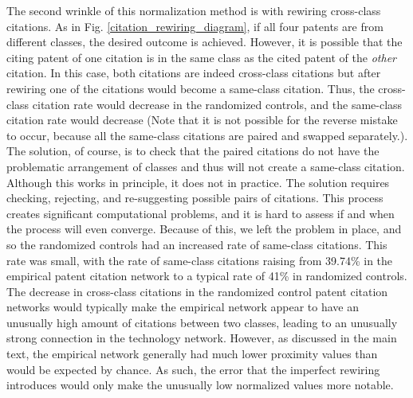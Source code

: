\documentclass[]{svjour3}
\begin{document}
The second wrinkle of this normalization method is with rewiring cross-class citations. As in Fig. \ref{citation_rewiring_diagram}, if all four patents are from different classes, the desired outcome is achieved. However, it is possible that the citing patent of one citation is in the same class as the cited patent of the \textit{other} citation. In this case, both citations are indeed cross-class citations but after rewiring one of the citations would become a same-class citation. Thus, the cross-class citation rate would decrease in the randomized controls, and the same-class citation rate would decrease (Note that it is not possible for the reverse mistake to occur, because all the same-class citations are paired and swapped separately.). The solution, of course, is to check that the paired citations do not have the problematic arrangement of classes and thus will not create a same-class citation. Although this works in principle, it does not in practice. The solution requires checking, rejecting, and re-suggesting possible pairs of citations. This process creates significant computational problems, and it is hard to assess if and when the process will even converge. Because of this, we left the problem in place, and so the randomized controls had an increased rate of same-class citations. This rate was small, with the rate of same-class citations raising from 39.74\% in the empirical patent citation network to a typical rate of 41\% in randomized controls. The decrease in cross-class citations in the randomized control patent citation networks would typically make the empirical network appear to have an unusually high amount of citations between two classes, leading to an unusually strong connection in the technology network. However, as discussed in the main text, the empirical network generally had much lower proximity values than would be expected by chance. As such, the error that the imperfect rewiring introduces would only make the unusually low normalized values more notable.
\end{document}
